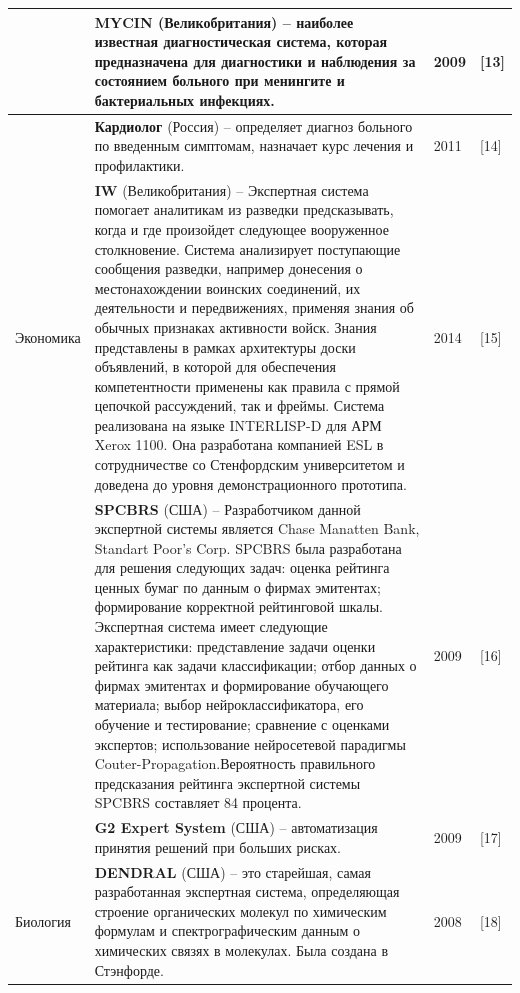 \documentclass[14pt,a4paper,report]{report}
\begin{document}
\begin{table}[h!]
\begin{tabular}{ | P{2cm} | P{13cm} | P{1cm} | P{0.5cm} | }
& \textbf{MYCIN} (Великобритания) -- наиболее известная диагностическая система, которая предназначена для диагностики и наблюдения за состоянием больного при менингите и бактериальных инфекциях. & 2009 & [13] \\ \hline

& \textbf{Кардиолог} (Россия) -- определяет диагноз больного по введенным симптомам, назначает курс лечения и профилактики. & 2011 & [14] \\ \hline


Экономика 

& \textbf{IW} (Великобритания) -- Экспертная система помогает аналитикам из разведки предсказывать, когда и где произойдет следующее вооруженное столкновение. Система анализирует поступающие сообщения разведки, например донесения о местонахождении воинских соединений, их деятельности и передвижениях, применяя знания об обычных признаках активности войск. Знания представлены в рамках архитектуры доски объявлений, в которой для обеспечения компетентности применены как правила с прямой цепочкой рассуждений, так и фреймы. Система реализована на языке INTERLISP-D для АРМ Xerox 1100. Она разработана компанией ESL в сотрудничестве со Стенфордским университетом и доведена до уровня демонстрационного прототипа. & 2014 & [15] \\ \hline

& \textbf{SPCBRS } (США) -- Разработчиком данной экспертной системы является Chase Manatten Bank, Standart Poor's Corp. SPCBRS была разработана для решения следующих задач: оценка рейтинга ценных бумаг по данным о фирмах эмитентах; формирование корректной рейтинговой шкалы. Экспертная система имеет следующие характеристики: представление задачи оценки рейтинга как задачи классификации; отбор данных о фирмах эмитентах и формирование обучающего материала; выбор нейроклассификатора, его обучение и тестирование; сравнение с оценками экспертов; использование нейросетевой парадигмы Couter-Propagation.Вероятность правильного предсказания рейтинга экспертной системы SPCBRS составляет 84 процента. & 2009 & [16] \\ \hline

& \textbf{G2 Expert System} (США) -- автоматизация принятия решений при больших рисках. & 2009 & [17] \\ \hline


Биология 

& \textbf{DENDRAL} (США) -- это старейшая, самая разработанная экспертная система, определяющая строение органических молекул по химическим формулам и спектрографическим данным о химических связях в молекулах. Была создана в Стэнфорде. & 2008 & [18] \\ \hline


\end{tabular}
\end{table}
\end{document}

